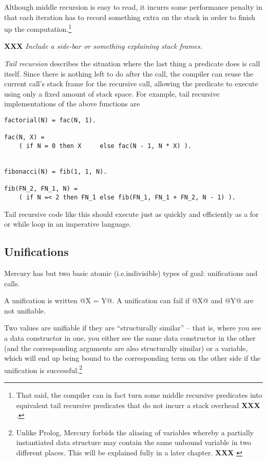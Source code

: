 \documentclass[a4paper,11pt,notitlepage,onecolumn]{article}
\makeatletter
\newcommand{\ie}%
{i.e.\@ }
\newcommand{\XXX}[1]%
{{\small\textbf{XXX} \emph{#1}}}
\makeatother
\begin{document}
Although middle recursion is easy to read, it incurrs some
performance penalty in that each iteration has to record
something extra on the stack in order to finish up the
computation.\footnote{That said, the compiler can in fact turn some
middle recursive predicates into equivalent tail recursive
predicates that do not incurr a stack overhead \XXX{}.}

\XXX{Include a side-bar or something explaining stack frames.}

\emph{Tail recursion} describes the situation where the last thing a
predicate does is call itself.  Since there is nothing left to
do after the call, the compiler can reuse the current call's
stack frame for the recursive call, allowing the predicate to
execute using only a fixed amount of stack space.  For
example, tail recursive implementations of the above
functions are
\begin{verbatim}
factorial(N) = fac(N, 1).

fac(N, X) =
    ( if N = 0 then X     else fac(N - 1, N * X) ).


fibonacci(N) = fib(1, 1, N).

fib(FN_2, FN_1, N) =
    ( if N =< 2 then FN_1 else fib(FN_1, FN_1 + FN_2, N - 1) ).
\end{verbatim}
Tail recursive code like this should execute just as quickly
and efficiently as a for or while loop in an imperative
language.

\subsection{Unifications}

Mercury has but two basic atomic (\ie indivisible) types of
goal: unifications and calls.

A unification is written @X = Y@.  A unification can fail if @X@
and @Y@ are not unifiable.

Two values are unifiable if they are ``structurally similar'' --
that is, where you see a data constructor in one, you either
see the same data constructor in the other (and the
corresponding arguments are also structurally similar) or a
variable, which will end up being bound to the corresponding
term on the other side if the unification is successful.\footnote{Unlike Prolog, Mercury forbids the aliasing of
variables whereby a partially instantiated data structure
may contain the same unbound variable in two different places.
This will be explained fully in a later chapter.  \XXX{}}
\end{document}

